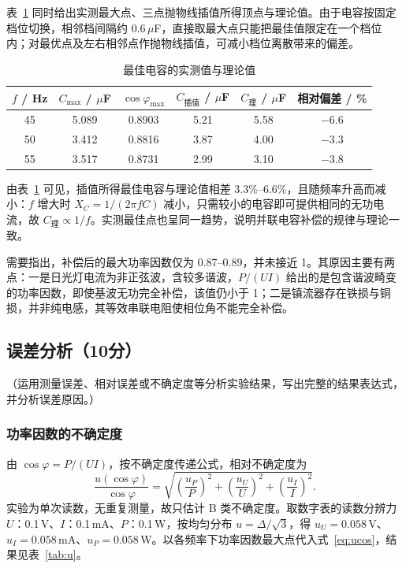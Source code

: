 \documentclass{Phyport}
\begin{document}
表~\ref{tab:opt} 同时给出实测最大点、三点抛物线插值所得顶点与理论值。由于电容按固定档位切换，相邻档间隔约 0.6\,$\mu$F，直接取最大点只能把最佳值限定在一个档位内；对最优点及左右相邻点作抛物线插值，可减小档位离散带来的偏差。

\begin{table}[H]
    \centering
    \caption{最佳电容的实测值与理论值}
    \label{tab:opt}
    \small
    \setlength{\tabcolsep}{4pt}
    \begin{tabular}{cccccc}
        \toprule
        $f$ / Hz & $C_{\max}$ / $\mu$F & $\cos\varphi_{\max}$ & $C_{\text{插值}}$ / $\mu$F & $C_{\text{理}}$ / $\mu$F & 相对偏差 / \% \\
        \midrule
        45 & 5.089 & 0.8903 & 5.21 & 5.58 & $-6.6$ \\
        50 & 3.412 & 0.8816 & 3.87 & 4.00 & $-3.3$ \\
        55 & 3.517 & 0.8731 & 2.99 & 3.10 & $-3.8$ \\
        \bottomrule
    \end{tabular}
\end{table}

由表~\ref{tab:opt} 可见，插值所得最佳电容与理论值相差 3.3\%--6.6\%，且随频率升高而减小：$f$ 增大时 $X_C=1/(2\pi fC)$ 减小，只需较小的电容即可提供相同的无功电流，故 $C_{\text{理}}\propto 1/f$。实测最佳点也呈同一趋势，说明并联电容补偿的规律与理论一致。

需要指出，补偿后的最大功率因数仅为 0.87--0.89，并未接近 1。其原因主要有两点：一是日光灯电流为非正弦波，含较多谐波，$P/(UI)$ 给出的是包含谐波畸变的功率因数，即使基波无功完全补偿，该值仍小于 1；二是镇流器存在铁损与铜损，并非纯电感，其等效串联电阻使相位角不能完全补偿。

\subsection{误差分析（10分）}
（运用测量误差、相对误差或不确定度等分析实验结果，写出完整的结果表达式，并分析误差原因。）

\subsubsection{功率因数的不确定度}

由 $\cos\varphi=P/(UI)$，按不确定度传递公式，相对不确定度为
\begin{equation}
    \frac{u(\cos\varphi)}{\cos\varphi}
    =\sqrt{\left(\frac{u_P}{P}\right)^2
    +\left(\frac{u_U}{U}\right)^2
    +\left(\frac{u_I}{I}\right)^2}.
    \label{eq:ucos}
\end{equation}
实验为单次读数，无重复测量，故只估计 B 类不确定度。取数字表的读数分辨力 $U$：0.1\,V、$I$：0.1\,mA、$P$：0.1\,W，按均匀分布 $u=\Delta/\sqrt{3}$，得 $u_U=0.058$\,V、$u_I=0.058$\,mA、$u_P=0.058$\,W。以各频率下功率因数最大点代入式~\eqref{eq:ucos}，结果见表~\ref{tab:u}。
\end{document}
